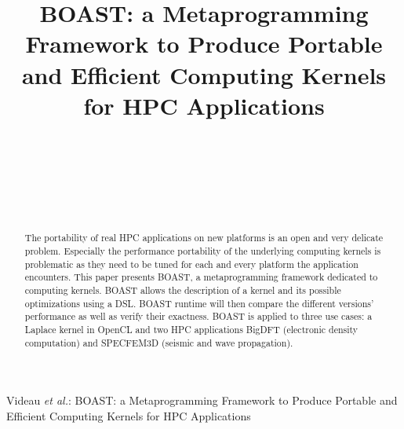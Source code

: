 \documentclass{IEEEtran}
\begin{document}
\title{BOAST: a Metaprogramming Framework to Produce Portable and Efficient Computing Kernels for HPC Applications}

\author{
   \\
   \\
   \\
   \\
   \\
}

{Videau \MakeLowercase{\textit{et al.}}: BOAST: a Metaprogramming Framework to Produce Portable and Efficient Computing Kernels for HPC Applications}


\maketitle

\begin{abstract}
The portability of real HPC applications on new platforms is an open and very
delicate problem.  Especially the performance portability of the underlying
computing kernels is problematic as they need to be tuned for each and every
platform the application encounters. This paper presents BOAST, a
metaprogramming framework dedicated to computing kernels.  BOAST allows the
description of a kernel and its possible optimizations using a DSL. BOAST
runtime will then compare the different versions' performance as well as verify
their exactness. BOAST is applied to three use cases: a Laplace kernel in
OpenCL and two HPC applications BigDFT (electronic density computation) and
SPECFEM3D (seismic and wave propagation).
\end{abstract}
\end{document}
